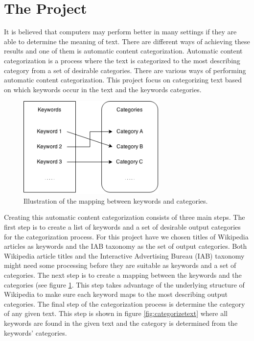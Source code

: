 \section{The Project}
It is believed that computers may perform better in many settings if they are able to determine the meaning of text. There are different ways of achieving these results and one of them is automatic content categorization. Automatic content categorization is a process where the text is categorized to the most describing category from a set of desirable categories. There are various ways of performing automatic content categorization. This project focus on categorizing text based on which keywords occur in the text and the keywords categories. 

\begin{figure}[h]
\centering
\includegraphics[width=0.65\textwidth]{Chapters/Introduction/keywordstocategories}
\caption{Illustration of the mapping between keywords and categories.}
\label{fig:keywordstocategories}
\end{figure}


Creating this automatic content categorization consists of three main steps. The first step is to create a list of keywords and a set of desirable output categories for the categorization process. For this project have we chosen titles of Wikipedia articles as keywords and the IAB taxonomy as the set of output categories. 
Both Wikipedia article titles and the Interactive Advertising Bureau (IAB) taxonomy might need some processing before they are suitable as keywords and a set of categories. The next step is to create a mapping between the keywords and the categories (see figure \ref{fig:keywordstocategories}. This step takes advantage of the underlying structure of Wikipedia to make sure each keyword maps to the most describing output categories. The final step of the categorization process is determine the category of any given text. This step is shown in figure \ref{fig:categorizetext} where all keywords are found in the given text and the category is determined from the keywords' categories. 

